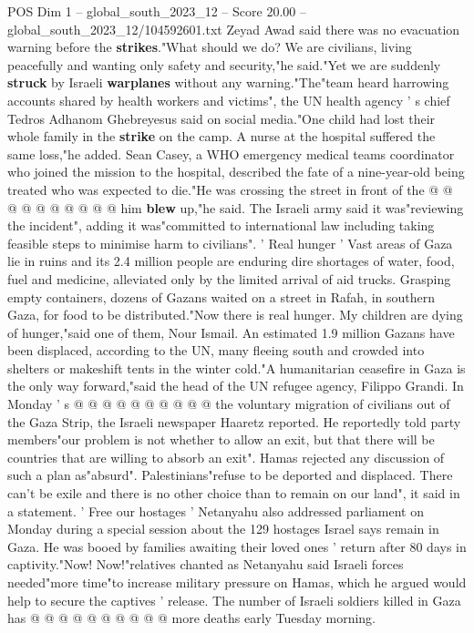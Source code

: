 \begin{textsample}{POS Dim 1 – global\_south\_2023\_12 – Score 20.00 – global\_south\_2023\_12/104592601.txt}
Zeyad Awad said there was no evacuation warning before the \textbf{strikes}."What should we do?
We are civilians, living peacefully and wanting only safety and security,"he said."Yet we are suddenly \textbf{struck} by Israeli \textbf{warplanes} without any warning."The"team heard harrowing accounts shared by health workers and victims", the UN health agency ' s chief Tedros Adhanom Ghebreyesus said on social media."One child had lost their whole family in the \textbf{strike} on the camp.
A nurse at the hospital suffered the same loss,"he added.
Sean Casey, a WHO emergency medical teams coordinator who joined the mission to the hospital, described the fate of a nine-year-old being treated who was expected to die."He was crossing the street in front of the @ @ @ @ @ @ @ @ @ @ him \textbf{blew} up,"he said.
The Israeli army said it was"reviewing the incident", adding it was"committed to international law including taking feasible steps to minimise harm to civilians". ' Real hunger ' Vast areas of Gaza lie in ruins and its 2.4 million people are enduring dire shortages of water, food, fuel and medicine, alleviated only by the limited arrival of aid trucks.
Grasping empty containers, dozens of Gazans waited on a street in Rafah, in southern Gaza, for food to be distributed."Now there is real hunger.
My children are dying of hunger,"said one of them, Nour Ismail.
An estimated 1.9 million Gazans have been displaced, according to the UN, many fleeing south and crowded into shelters or makeshift tents in the winter cold."A humanitarian ceasefire in Gaza is the only way forward,"said the head of the UN refugee agency, Filippo Grandi.
In Monday ' s @ @ @ @ @ @ @ @ @ @ the voluntary migration of civilians out of the Gaza Strip, the Israeli newspaper Haaretz reported.
He reportedly told party members"our problem is not whether to allow an exit, but that there will be countries that are willing to absorb an exit".
Hamas rejected any discussion of such a plan as"absurd".
Palestinians"refuse to be deported and displaced.
There can't be exile and there is no other choice than to remain on our land", it said in a statement. ' Free our hostages ' Netanyahu also addressed parliament on Monday during a special session about the 129 hostages Israel says remain in Gaza.
He was booed by families awaiting their loved ones ' return after 80 days in captivity."Now!
Now!"relatives chanted as Netanyahu said Israeli forces needed"more time"to increase military pressure on Hamas, which he argued would help to secure the captives ' release.
The number of Israeli soldiers killed in Gaza has @ @ @ @ @ @ @ @ @ @ more deaths early Tuesday morning.

\end{textsample}
